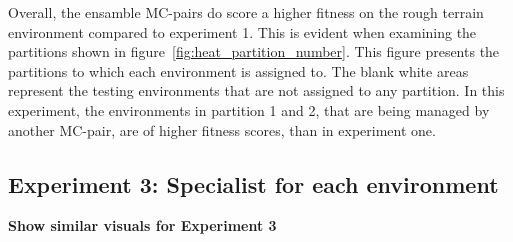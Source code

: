             Overall, the ensamble MC-pairs do score a higher fitness on the rough terrain environment compared to experiment 1. This is evident when examining the partitions shown in figure~\ref{fig:heat_partition_number}. This figure presents the partitions to which each environment is assigned to. The blank white areas represent the testing environments that are not assigned to any partition. In this experiment, the environments in partition 1 and 2, that are being managed by another MC-pair, are of higher fitness scores, than in experiment one.

        \subsection{Experiment 3: Specialist for each environment}
            \textbf{Show similar visuals for Experiment 3}

